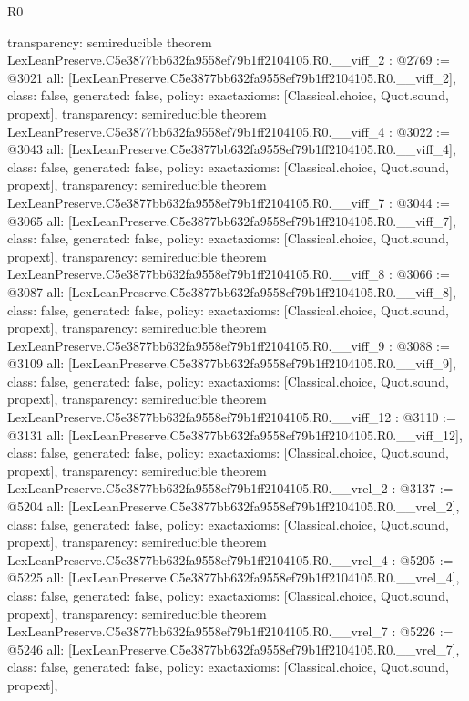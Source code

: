 \begin{lexlean}{R0}
\begin{coremodule}
{  transparency: semireducible
}
theorem LexLeanPreserve.C5e3877bb632fa9558ef79b1ff2104105.R0.__viff_2 : @2769 := @3021 {
  all: [LexLeanPreserve.C5e3877bb632fa9558ef79b1ff2104105.R0.__viff_2],
  class: false,
  generated: false,
  policy: exact{axioms: [Classical.choice, Quot.sound, propext]},
  transparency: semireducible
}
theorem LexLeanPreserve.C5e3877bb632fa9558ef79b1ff2104105.R0.__viff_4 : @3022 := @3043 {
  all: [LexLeanPreserve.C5e3877bb632fa9558ef79b1ff2104105.R0.__viff_4],
  class: false,
  generated: false,
  policy: exact{axioms: [Classical.choice, Quot.sound, propext]},
  transparency: semireducible
}
theorem LexLeanPreserve.C5e3877bb632fa9558ef79b1ff2104105.R0.__viff_7 : @3044 := @3065 {
  all: [LexLeanPreserve.C5e3877bb632fa9558ef79b1ff2104105.R0.__viff_7],
  class: false,
  generated: false,
  policy: exact{axioms: [Classical.choice, Quot.sound, propext]},
  transparency: semireducible
}
theorem LexLeanPreserve.C5e3877bb632fa9558ef79b1ff2104105.R0.__viff_8 : @3066 := @3087 {
  all: [LexLeanPreserve.C5e3877bb632fa9558ef79b1ff2104105.R0.__viff_8],
  class: false,
  generated: false,
  policy: exact{axioms: [Classical.choice, Quot.sound, propext]},
  transparency: semireducible
}
theorem LexLeanPreserve.C5e3877bb632fa9558ef79b1ff2104105.R0.__viff_9 : @3088 := @3109 {
  all: [LexLeanPreserve.C5e3877bb632fa9558ef79b1ff2104105.R0.__viff_9],
  class: false,
  generated: false,
  policy: exact{axioms: [Classical.choice, Quot.sound, propext]},
  transparency: semireducible
}
theorem LexLeanPreserve.C5e3877bb632fa9558ef79b1ff2104105.R0.__viff_12 : @3110 := @3131 {
  all: [LexLeanPreserve.C5e3877bb632fa9558ef79b1ff2104105.R0.__viff_12],
  class: false,
  generated: false,
  policy: exact{axioms: [Classical.choice, Quot.sound, propext]},
  transparency: semireducible
}
theorem LexLeanPreserve.C5e3877bb632fa9558ef79b1ff2104105.R0.__vrel_2 : @3137 := @5204 {
  all: [LexLeanPreserve.C5e3877bb632fa9558ef79b1ff2104105.R0.__vrel_2],
  class: false,
  generated: false,
  policy: exact{axioms: [Classical.choice, Quot.sound, propext]},
  transparency: semireducible
}
theorem LexLeanPreserve.C5e3877bb632fa9558ef79b1ff2104105.R0.__vrel_4 : @5205 := @5225 {
  all: [LexLeanPreserve.C5e3877bb632fa9558ef79b1ff2104105.R0.__vrel_4],
  class: false,
  generated: false,
  policy: exact{axioms: [Classical.choice, Quot.sound, propext]},
  transparency: semireducible
}
theorem LexLeanPreserve.C5e3877bb632fa9558ef79b1ff2104105.R0.__vrel_7 : @5226 := @5246 {
  all: [LexLeanPreserve.C5e3877bb632fa9558ef79b1ff2104105.R0.__vrel_7],
  class: false,
  generated: false,
  policy: exact{axioms: [Classical.choice, Quot.sound, propext]},
}
\end{coremodule}
\end{lexlean}
